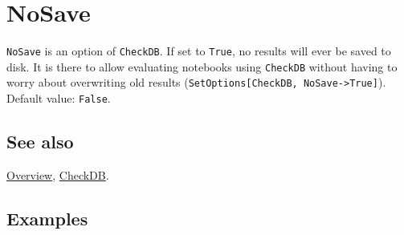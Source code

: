 \documentclass[../FeynCalcManual.tex]{subfiles}
\begin{document}
\hypertarget{nosave}{
\section{NoSave}\label{nosave}}

\texttt{NoSave} is an option of \texttt{CheckDB}. If set to
\texttt{True}, no results will ever be saved to disk. It is there to
allow evaluating notebooks using \texttt{CheckDB} without having to
worry about overwriting old results
(\texttt{SetOptions[\allowbreak{}CheckDB,\ \allowbreak{}NoSave->True]}).
Default value: \texttt{False}.

\subsection{See also}

\hyperlink{toc}{Overview}, \hyperlink{checkdb}{CheckDB}.

\subsection{Examples}
\end{document}
